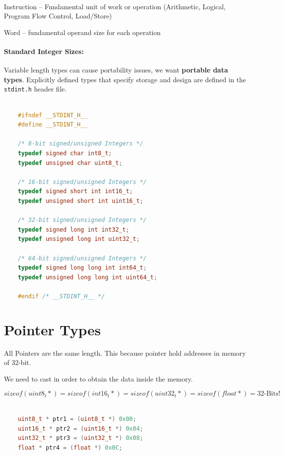 \paragraph{}
Instruction – Fundamental unit of work or operation (Arithmetic, Logical, Program Flow Control, Load/Store)

Word – fundamental operand size for each operation


\paragraph{Standard Integer Sizes: }Variable length types can cause portability issues, we want \textbf{portable data types}. Explicitly defined types that specify storage and design are defined in the \verb|stdint.h| header file.


\begin{lstlisting}[language=c++]

    #ifndef __STDINT_H__
    #define __STDINT_H__
    
    /* 8-bit signed/unsigned Integers */
    typedef signed char int8_t;
    typedef unsigned char uint8_t;
    
    /* 16-bit signed/unsigned Integers */
    typedef signed short int int16_t;
    typedef unsigned short int uint16_t;
    
    /* 32-bit signed/unsigned Integers */
    typedef signed long int int32_t;
    typedef unsigned long int uint32_t;
    
    /* 64-bit signed/unsigned Integers */
    typedef signed long long int int64_t;
    typedef unsigned long long int uint64_t;
    
    #endif /* __STDINT_H__ */
\end{lstlisting}

\section{Pointer Types}

All Pointers are the same length. This because pointer hold addresses in memory of 32-bit.

We need to cast in order to obtain the data inside the memory.

\begin{equation*}
    sizeof(uint8_t*) = sizeof(int16_t*) = sizeof(uint32_t*) = sizeof(float*) = \text{32-Bits!}
\end{equation*}

\begin{lstlisting}[language=c++]

    uint8_t * ptr1 = (uint8_t *) 0x00;
    uint16_t * ptr2 = (uint16_t *) 0x04;
    uint32_t * ptr3 = (uint32_t *) 0x08;
    float * ptr4 = (float *) 0x0C;
\end{lstlisting}

